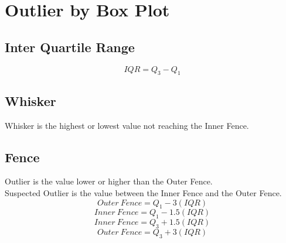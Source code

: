 \documentclass[twocolumn]{article}
\begin{document}
    \newpage

    \section{Outlier by Box Plot}
    \subsection{Inter Quartile Range}
    \begin{equation}
        IQR = Q_{3}-Q_{1}
    \end{equation}
    \subsection{Whisker}
    Whisker is the highest or lowest value not reaching the Inner Fence.
    \subsection{Fence}
    Outlier is the value lower or higher than the Outer Fence.\\
    Suspected Outlier is the value between the Inner Fence and the Outer Fence.
    \begin{equation}
        Outer\ Fence = Q_{1} - 3(IQR)
    \end{equation}
    \begin{equation}
        Inner\ Fence = Q_{1} - 1.5(IQR)
    \end{equation}
    \begin{equation}
        Inner\ Fence = Q_{3} + 1.5(IQR)
    \end{equation}
    \begin{equation}
        Outer\ Fence = Q_{3} + 3(IQR)
    \end{equation}
\end{document}
